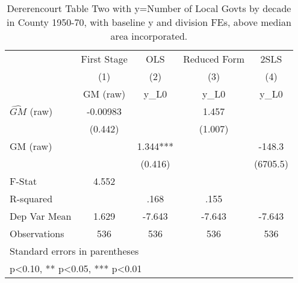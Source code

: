 \begin{table}[htbp]\centering
\def\sym#1{\ifmmode^{#1}\else\(^{#1}\)\fi}
\caption{Dererencourt Table Two with y=Number of Local Govts by decade in County 1950-70, with baseline y and division FEs, above median area incorporated.}
\begin{tabular}{l*{4}{c}}
\toprule
                    & First Stage   &         OLS   &Reduced Form   &        2SLS   \\
                    &\multicolumn{1}{c}{(1)}&\multicolumn{1}{c}{(2)}&\multicolumn{1}{c}{(3)}&\multicolumn{1}{c}{(4)}\\
                    &\multicolumn{1}{c}{GM  (raw)}&\multicolumn{1}{c}{y\_L0}&\multicolumn{1}{c}{y\_L0}&\multicolumn{1}{c}{y\_L0}\\
\midrule
$\hat{GM}$ (raw)    &    -0.00983   &               &       1.457   &               \\
                    &     (0.442)   &               &     (1.007)   &               \\
\addlinespace
GM  (raw)           &               &       1.344***&               &      -148.3   \\
                    &               &     (0.416)   &               &    (6705.5)   \\
\midrule
F-Stat              &       4.552   &               &               &               \\
R-squared           &               &        .168   &        .155   &               \\
Dep Var Mean        &       1.629   &      -7.643   &      -7.643   &      -7.643   \\
Observations        &         536   &         536   &         536   &         536   \\
\bottomrule
\multicolumn{5}{l}{\footnotesize Standard errors in parentheses}\\
\multicolumn{5}{l}{\footnotesize * p<0.10, ** p<0.05, *** p<0.01}\\
\end{tabular}
\end{table}
